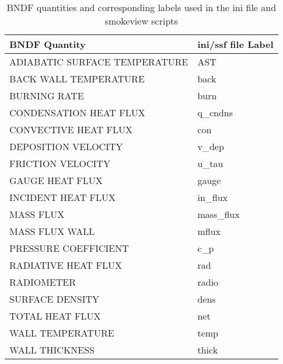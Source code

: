 \begin{table}[bph]
\begin{center}
\caption{BNDF quantities and corresponding labels used in the ini file and smokeview scripts}
\vspace{0.1in}
\begin{tabular}{|l|l|}
\hline
BNDF Quantity & ini/ssf file Label \\ \hline
{\ct  ADIABATIC SURFACE TEMPERATURE } & {\ct   AST } \\ \hline
{\ct  BACK WALL TEMPERATURE } & {\ct   back } \\ \hline
{\ct  BURNING RATE } & {\ct   burn } \\ \hline
{\ct  CONDENSATION HEAT FLUX } & {\ct   q\_cndns } \\ \hline
{\ct  CONVECTIVE HEAT FLUX } & {\ct   con } \\ \hline
{\ct  DEPOSITION VELOCITY } & {\ct   v\_dep } \\ \hline
{\ct  FRICTION VELOCITY } & {\ct   u\_tau } \\ \hline
{\ct  GAUGE HEAT FLUX } & {\ct   gauge } \\ \hline
{\ct  INCIDENT HEAT FLUX } & {\ct   in\_flux } \\ \hline
{\ct  MASS FLUX } & {\ct   mass\_flux } \\ \hline
{\ct  MASS FLUX WALL } & {\ct   mflux } \\ \hline
{\ct  PRESSURE COEFFICIENT } & {\ct   c\_p } \\ \hline
{\ct  RADIATIVE HEAT FLUX } & {\ct   rad } \\ \hline
{\ct  RADIOMETER } & {\ct   radio } \\ \hline
{\ct  SURFACE DENSITY } & {\ct   dens } \\ \hline
{\ct  TOTAL HEAT FLUX } & {\ct   net } \\ \hline
{\ct  WALL TEMPERATURE } & {\ct   temp } \\ \hline
{\ct  WALL THICKNESS } & {\ct   thick } \\ \hline
\end{tabular}
\label{tabBNDF}
\end{center}
\end{table}
